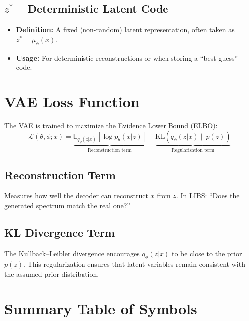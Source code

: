 \documentclass[12pt,a4paper]{article}
\begin{document}
	\subsection{\( z^* \) -- Deterministic Latent Code}
	\begin{itemize}
		\item \textbf{Definition:} A fixed (non-random) latent representation, often taken as \( z^* = \mu_\phi(x) \).
		\item \textbf{Usage:} For deterministic reconstructions or when storing a “best guess” code.
	\end{itemize}
	
	\section{VAE Loss Function}
	
	The VAE is trained to maximize the Evidence Lower Bound (ELBO):
	\[
	\mathcal{L}(\theta, \phi; x) =
	\underbrace{\mathbb{E}_{q_\phi(z|x)}[\log p_\theta(x|z)]}_{\text{Reconstruction term}}
	-
	\underbrace{\mathrm{KL}\left(q_\phi(z|x) \parallel p(z)\right)}_{\text{Regularization term}}
	\]
	
	\subsection{Reconstruction Term}
	Measures how well the decoder can reconstruct \( x \) from \( z \).  
	In LIBS: ``Does the generated spectrum match the real one?''
	
	\subsection{KL Divergence Term}
	The Kullback–Leibler divergence encourages \( q_\phi(z|x) \) to be close to the prior \( p(z) \).  
	This regularization ensures that latent variables remain consistent with the assumed prior distribution.
	
	\section{Summary Table of Symbols}
	
\end{document}
